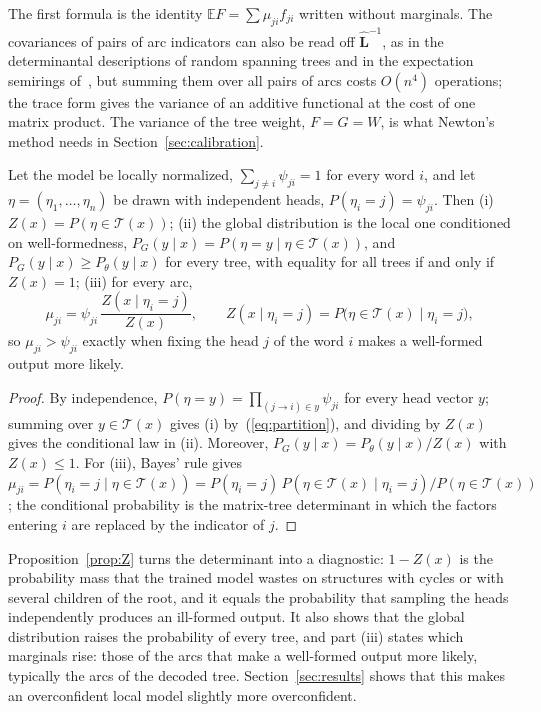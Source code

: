 \documentclass[mathematics,article,submit,pdftex,oneauthor]{Definitions/mdpi}
\newcommand{\T}{\mathcal T}
\newcommand{\E}{\mathbb E}
\newcommand{\Lh}{\hat{\mathbf L}}
\begin{document}
The first formula is the identity $\E F=\sum\mu_{ji}f_{ji}$ written without marginals.
The covariances of pairs of arc indicators can also be read off $\Lh^{-1}$, as in the determinantal descriptions of random spanning trees and in the expectation semirings of~\cite{Zmigrod2021}, but summing them over all pairs of arcs costs $O(n^4)$ operations; the trace form gives the variance of an additive functional at the cost of one matrix product.
The variance of the tree weight, $F=G=W$, is what Newton's method needs in Section~\ref{sec:calibration}.

\begin{Proposition}\label{prop:Z}
Let the model be locally normalized, $\sum_{j\neq i}\psi_{ji}=1$ for every word $i$, and let $\eta=(\eta_1,\dots,\eta_n)$ be drawn with independent heads, $P(\eta_i=j)=\psi_{ji}$.
Then (i) $Z(x)=P(\eta\in\T(x))$; (ii) the global distribution is the local one conditioned on well-formedness, $P_G(y\mid x)=P(\eta=y\mid\eta\in\T(x))$, and $P_G(y\mid x)\geqslant P_\theta(y\mid x)$ for every tree, with equality for all trees if and only if $Z(x)=1$; (iii) for every arc,
\begin{equation}\label{eq:muratio}
\mu_{ji}=\psi_{ji}\,\frac{Z(x\mid\eta_i=j)}{Z(x)},\qquad Z(x\mid\eta_i=j)=P\bigl(\eta\in\T(x)\mid\eta_i=j\bigr),
\end{equation}
so $\mu_{ji}>\psi_{ji}$ exactly when fixing the head $j$ of the word $i$ makes a well-formed output more likely.
\end{Proposition}
\begin{proof}
By independence, $P(\eta=y)=\prod_{(j\to i)\in y}\psi_{ji}$ for every head vector $y$; summing over $y\in\T(x)$ gives (i) by~(\ref{eq:partition}), and dividing by $Z(x)$ gives the conditional law in (ii).
Moreover, $P_G(y\mid x)=P_\theta(y\mid x)/Z(x)$ with $Z(x)\leqslant1$.
For (iii), Bayes' rule gives $\mu_{ji}=P(\eta_i=j\mid\eta\in\T(x))=P(\eta_i=j)\,P(\eta\in\T(x)\mid\eta_i=j)/P(\eta\in\T(x))$; the conditional probability is the matrix-tree determinant in which the factors entering $i$ are replaced by the indicator of $j$.
\end{proof}

Proposition~\ref{prop:Z} turns the determinant into a diagnostic: $1-Z(x)$ is the probability mass that the trained model wastes on structures with cycles or with several children of the root, and it equals the probability that sampling the heads independently produces an ill-formed output.
It also shows that the global distribution raises the probability of every tree, and part (iii) states which marginals rise: those of the arcs that make a well-formed output more likely, typically the arcs of the decoded tree.
Section~\ref{sec:results} shows that this makes an overconfident local model slightly more overconfident.
\end{document}
